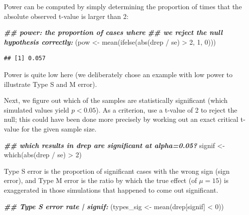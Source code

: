 \documentclass[
  12pt,
]{krantz}
\newenvironment{Shaded}{\begin{snugshade}}{\end{snugshade}}
\newcommand{\DecValTok}[1]{\textcolor[rgb]{0.00,0.00,0.81}{#1}}
\newcommand{\DocumentationTok}[1]{\textcolor[rgb]{0.56,0.35,0.01}{\textbf{\textit{#1}}}}
\newcommand{\FunctionTok}[1]{\textcolor[rgb]{0.00,0.00,0.00}{#1}}
\newcommand{\NormalTok}[1]{#1}
\newcommand{\OtherTok}[1]{\textcolor[rgb]{0.56,0.35,0.01}{#1}}
\newcommand{\SpecialCharTok}[1]{\textcolor[rgb]{0.00,0.00,0.00}{#1}}
\theoremstyle{definition}
\theoremstyle{definition}
\theoremstyle{definition}
\theoremstyle{definition}
\theoremstyle{remark}
\begin{document}
Power can be computed by simply determining the proportion of times that the absolute observed t-value is larger than 2:

\begin{Shaded}
\begin{Highlighting}[]
\DocumentationTok{\#\# power: the proportion of cases where}
\DocumentationTok{\#\# we reject the null hypothesis correctly:}
\NormalTok{(pow }\OtherTok{\textless{}{-}} \FunctionTok{mean}\NormalTok{(}\FunctionTok{ifelse}\NormalTok{(}\FunctionTok{abs}\NormalTok{(drep }\SpecialCharTok{/}\NormalTok{ se) }\SpecialCharTok{\textgreater{}} \DecValTok{2}\NormalTok{, }\DecValTok{1}\NormalTok{, }\DecValTok{0}\NormalTok{)))}
\end{Highlighting}
\end{Shaded}

\begin{verbatim}
## [1] 0.057
\end{verbatim}

Power is quite low here (we deliberately chose an example with low power to illustrate Type S and M error).

Next, we figure out which of the samples are statistically significant (which simulated values yield \(p<0.05\)). As a criterion, use a t-value of 2 to reject the null; this could have been done more precisely by working out an exact critical t-value for the given sample size.

\begin{Shaded}
\begin{Highlighting}[]
\DocumentationTok{\#\# which results in drep are significant at alpha=0.05?}
\NormalTok{signif }\OtherTok{\textless{}{-}} \FunctionTok{which}\NormalTok{(}\FunctionTok{abs}\NormalTok{(drep }\SpecialCharTok{/}\NormalTok{ se) }\SpecialCharTok{\textgreater{}} \DecValTok{2}\NormalTok{)}
\end{Highlighting}
\end{Shaded}

Type S error is the proportion of significant cases with the wrong sign (sign error), and Type M error is the ratio by which the true effect (of \(\mu=15\)) is exaggerated in those simulations that happened to come out significant.

\begin{Shaded}
\begin{Highlighting}[]
\DocumentationTok{\#\# Type S error rate | signif:}
\NormalTok{(types\_sig }\OtherTok{\textless{}{-}} \FunctionTok{mean}\NormalTok{(drep[signif] }\SpecialCharTok{\textless{}} \DecValTok{0}\NormalTok{))}
\end{Highlighting}
\end{Shaded}
\end{document}
